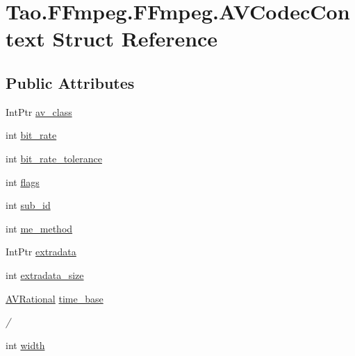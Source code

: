 \hypertarget{struct_tao_1_1_f_fmpeg_1_1_f_fmpeg_1_1_a_v_codec_context}{
\section{Tao.FFmpeg.FFmpeg.AVCodecContext Struct Reference}
\label{struct_tao_1_1_f_fmpeg_1_1_f_fmpeg_1_1_a_v_codec_context}
}
\subsection*{Public Attributes}
\begin{DoxyCompactItemize}
\item 
IntPtr \hyperlink{struct_tao_1_1_f_fmpeg_1_1_f_fmpeg_1_1_a_v_codec_context_aea01af6a02e45ca86b2e3efb1592cca5}{av\_\-class}
\item 
int \hyperlink{struct_tao_1_1_f_fmpeg_1_1_f_fmpeg_1_1_a_v_codec_context_a0a8e50b35f351e617127cb0f91e88759}{bit\_\-rate}
\item 
int \hyperlink{struct_tao_1_1_f_fmpeg_1_1_f_fmpeg_1_1_a_v_codec_context_a1e73fb42e78886d60d885da09eaed9f2}{bit\_\-rate\_\-tolerance}
\item 
int \hyperlink{struct_tao_1_1_f_fmpeg_1_1_f_fmpeg_1_1_a_v_codec_context_ad8269b772f85e7a95dd82c9a6bdeab8f}{flags}
\item 
int \hyperlink{struct_tao_1_1_f_fmpeg_1_1_f_fmpeg_1_1_a_v_codec_context_aa32c65e2d1dddf72f44fccd5ac8c5f02}{sub\_\-id}
\item 
int \hyperlink{struct_tao_1_1_f_fmpeg_1_1_f_fmpeg_1_1_a_v_codec_context_a8615f3d2b4bb300b38ed38f9d4bb8cf2}{me\_\-method}
\item 
IntPtr \hyperlink{struct_tao_1_1_f_fmpeg_1_1_f_fmpeg_1_1_a_v_codec_context_a712a4bbdf50103256d35590cc403c482}{extradata}
\item 
int \hyperlink{struct_tao_1_1_f_fmpeg_1_1_f_fmpeg_1_1_a_v_codec_context_ac94887ce348e4f1dab611e079b2a8ea2}{extradata\_\-size}
\item 
\hyperlink{struct_tao_1_1_f_fmpeg_1_1_f_fmpeg_1_1_a_v_rational}{AVRational} \hyperlink{struct_tao_1_1_f_fmpeg_1_1_f_fmpeg_1_1_a_v_codec_context_afa09569e097671393d3033dd909ea1f3}{time\_\-base}
\begin{DoxyCompactList}\small\item\em / \item\end{DoxyCompactList}\item 
int \hyperlink{struct_tao_1_1_f_fmpeg_1_1_f_fmpeg_1_1_a_v_codec_context_a64a5f01f15cc28df8b34f00e5da8e993}{width}

\end{DoxyCompactItemize}
